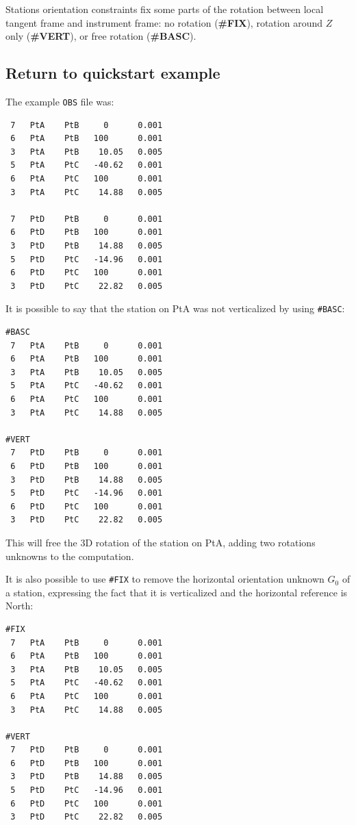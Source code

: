 Stations orientation constraints fix some parts of the rotation between local tangent frame and instrument frame:
no rotation (\textbf{\#FIX}), rotation around $Z$ only (\textbf{\#VERT}), or free rotation (\textbf{\#BASC}).



\subsection{Return to quickstart example}
The example \texttt{OBS} file was:
\begin{verbatim}
 7   PtA    PtB     0      0.001
 6   PtA    PtB   100      0.001
 3   PtA    PtB    10.05   0.005
 5   PtA    PtC   -40.62   0.001
 6   PtA    PtC   100      0.001
 3   PtA    PtC    14.88   0.005

 7   PtD    PtB     0      0.001
 6   PtD    PtB   100      0.001
 3   PtD    PtB    14.88   0.005
 5   PtD    PtC   -14.96   0.001
 6   PtD    PtC   100      0.001
 3   PtD    PtC    22.82   0.005
\end{verbatim}

It is possible to say that the station on PtA was not verticalized by using \texttt{\#BASC}:
\begin{verbatim}
#BASC
 7   PtA    PtB     0      0.001
 6   PtA    PtB   100      0.001
 3   PtA    PtB    10.05   0.005
 5   PtA    PtC   -40.62   0.001
 6   PtA    PtC   100      0.001
 3   PtA    PtC    14.88   0.005

#VERT
 7   PtD    PtB     0      0.001
 6   PtD    PtB   100      0.001
 3   PtD    PtB    14.88   0.005
 5   PtD    PtC   -14.96   0.001
 6   PtD    PtC   100      0.001
 3   PtD    PtC    22.82   0.005
\end{verbatim}

This will free the 3D rotation of the station on PtA, adding two rotations unknowns to the computation.
\newline

It is also possible to use \texttt{\#FIX} to remove the horizontal orientation unknown $G_0$ of a station, expressing the fact that it
is verticalized and the horizontal reference is North:
\begin{verbatim}
#FIX
 7   PtA    PtB     0      0.001
 6   PtA    PtB   100      0.001
 3   PtA    PtB    10.05   0.005
 5   PtA    PtC   -40.62   0.001
 6   PtA    PtC   100      0.001
 3   PtA    PtC    14.88   0.005

#VERT
 7   PtD    PtB     0      0.001
 6   PtD    PtB   100      0.001
 3   PtD    PtB    14.88   0.005
 5   PtD    PtC   -14.96   0.001
 6   PtD    PtC   100      0.001
 3   PtD    PtC    22.82   0.005
\end{verbatim}



